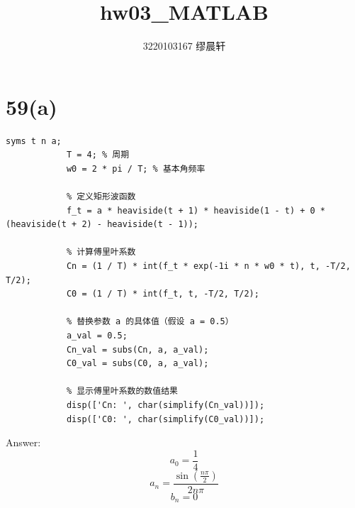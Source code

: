 \documentclass{article}
\title{hw03\_MATLAB}
\author{3220103167 缪晨轩}
\date{\zhdate{2024/3/17}}
\begin{document}
\maketitle
    \section*{59(a)}
        
        \begin{lstlisting}[caption={题59(a)MATLAB代码}, label={lst:matlab}]
            syms t n a;
            T = 4; % 周期
            w0 = 2 * pi / T; % 基本角频率

            % 定义矩形波函数
            f_t = a * heaviside(t + 1) * heaviside(1 - t) + 0 * (heaviside(t + 2) - heaviside(t - 1));

            % 计算傅里叶系数
            Cn = (1 / T) * int(f_t * exp(-1i * n * w0 * t), t, -T/2, T/2);
            C0 = (1 / T) * int(f_t, t, -T/2, T/2);

            % 替换参数 a 的具体值（假设 a = 0.5）
            a_val = 0.5;
            Cn_val = subs(Cn, a, a_val);
            C0_val = subs(C0, a, a_val);

            % 显示傅里叶系数的数值结果
            disp(['Cn: ', char(simplify(Cn_val))]);
            disp(['C0: ', char(simplify(C0_val))]);

        \end{lstlisting}
        Answer: \[a_0 = \frac{1}{4}\]
        \[a_n = \frac{{\sin \left( {\frac{{n\pi }}{2}} \right)}}{{2n\pi }}\]
        \[b_n = 0\]
\end{document}
